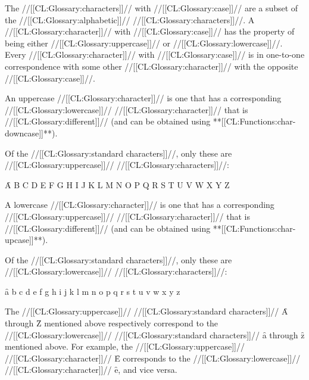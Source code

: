 \endsubsubsection%

 

The //[[CL:Glossary:characters]]// with //[[CL:Glossary:case]]// are  a subset of the //[[CL:Glossary:alphabetic]]// //[[CL:Glossary:characters]]//. A //[[CL:Glossary:character]]// with //[[CL:Glossary:case]]// has the property of being either //[[CL:Glossary:uppercase]]// or //[[CL:Glossary:lowercase]]//. Every //[[CL:Glossary:character]]// with //[[CL:Glossary:case]]// is in one-to-one correspondence with some other //[[CL:Glossary:character]]// with the opposite //[[CL:Glossary:case]]//.


An uppercase //[[CL:Glossary:character]]// is one that has a corresponding //[[CL:Glossary:lowercase]]// //[[CL:Glossary:character]]// that is //[[CL:Glossary:different]]//  (and can be obtained using **[[CL:Functions:char-downcase]]**).

Of the //[[CL:Glossary:standard characters]]//, only these are //[[CL:Glossary:uppercase]]// //[[CL:Glossary:characters]]//:

\f{A B C D E F G H I J K L M N O P Q R S T U V W X Y Z}

\endsubsubsubsection%


A lowercase //[[CL:Glossary:character]]// is one that has a corresponding  //[[CL:Glossary:uppercase]]// //[[CL:Glossary:character]]// that is //[[CL:Glossary:different]]//  (and can be obtained using **[[CL:Functions:char-upcase]]**).

Of the //[[CL:Glossary:standard characters]]//, only these are //[[CL:Glossary:lowercase]]// //[[CL:Glossary:characters]]//:

\f{a b c d e f g h i j k l m n o p q r s t u v w x y z}

\endsubsubsubsection%


The //[[CL:Glossary:uppercase]]// //[[CL:Glossary:standard characters]]// \f{A} through \f{Z} mentioned above respectively correspond to the //[[CL:Glossary:lowercase]]// //[[CL:Glossary:standard characters]]// \f{a} through \f{z} mentioned above. For example, the //[[CL:Glossary:uppercase]]// //[[CL:Glossary:character]]// \f{E}  corresponds to the //[[CL:Glossary:lowercase]]// //[[CL:Glossary:character]]// \f{e}, and vice versa.

